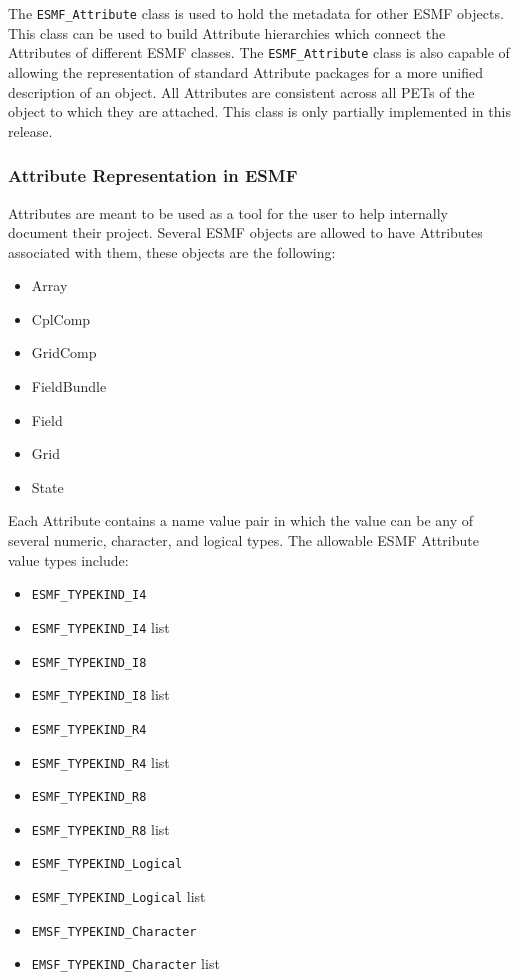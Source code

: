%

The {\tt ESMF\_Attribute} class is used to hold the metadata for other ESMF objects.  This class can be used to build Attribute hierarchies which connect the Attributes of different ESMF classes.  The {\tt ESMF\_Attribute} class is also capable of allowing the representation of standard Attribute packages for a more unified description of an object.  All Attributes are consistent across all PETs of the object to which they are attached.  This class is only partially implemented in this release.

\subsubsection{Attribute Representation in ESMF}

Attributes are meant to be used as a tool for the user to help internally document their project.   Several ESMF objects are allowed to have Attributes associated with them, these objects are the following:

\begin{itemize}
\item Array
\item CplComp
\item GridComp
\item FieldBundle
\item Field
\item Grid
\item State
\end{itemize}

Each Attribute contains a name value pair in which the value can be any of several numeric, character, and logical types.  The allowable ESMF Attribute value types include:

\begin{itemize}
\item {\tt ESMF\_TYPEKIND\_I4}
\item {\tt ESMF\_TYPEKIND\_I4} list
\item {\tt ESMF\_TYPEKIND\_I8}
\item {\tt ESMF\_TYPEKIND\_I8} list
\item {\tt ESMF\_TYPEKIND\_R4}
\item {\tt ESMF\_TYPEKIND\_R4} list
\item {\tt ESMF\_TYPEKIND\_R8}
\item {\tt ESMF\_TYPEKIND\_R8} list
\item {\tt ESMF\_TYPEKIND\_Logical}
\item {\tt ESMF\_TYPEKIND\_Logical} list
\item {\tt EMSF\_TYPEKIND\_Character}
\item {\tt EMSF\_TYPEKIND\_Character} list
\end{itemize}


